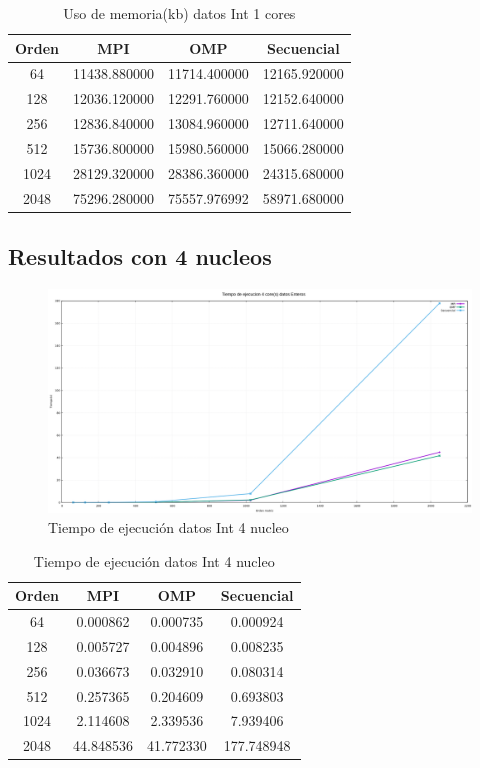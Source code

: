 \documentclass[10pt]{IEEEtran}
\begin{document}
\begin{table}[H]
  \caption{Uso de memoria(kb) datos Int 1 cores}
  \label{table_example}
  \centering
  \begin{tabular}{|c|c|c|c|}
    \hline
    \textbf{Orden} & \textbf{MPI} & \textbf{OMP} & \textbf{Secuencial} \\
    \hline
    64 & 11438.880000 & 11714.400000 & 12165.920000 \\
    128 & 12036.120000 & 12291.760000 & 12152.640000 \\
    256 & 12836.840000 & 13084.960000 & 12711.640000 \\
    512 & 15736.800000 & 15980.560000 & 15066.280000 \\
    1024 & 28129.320000 & 28386.360000 & 24315.680000 \\
    2048 & 75296.280000 & 75557.976992 & 58971.680000 \\
    \hline
  \end{tabular}
\end{table}

\subsection{Resultados con 4 nucleos}

\begin{figure}[H]
  \centering
  \includegraphics[width=0.95\linewidth]{figs/4nucleosEnterosTiempo.png}
  \caption{Tiempo de ejecución datos Int 4 nucleo}
  \label{fig:in}
\end{figure}

\begin{table}[H]
  \caption{Tiempo de ejecución datos Int 4 nucleo}
  \label{table_example}
  \centering
  \begin{tabular}{|c|c|c|c|}
    \hline
    \textbf{Orden} & \textbf{MPI} & \textbf{OMP} & \textbf{Secuencial} \\
    \hline
    64 & 0.000862 & 0.000735 & 0.000924 \\
    128 & 0.005727 & 0.004896 & 0.008235 \\
    256 & 0.036673 & 0.032910 & 0.080314 \\
    512 & 0.257365 & 0.204609 & 0.693803 \\
    1024 & 2.114608 & 2.339536 & 7.939406 \\
    2048 & 44.848536 & 41.772330 & 177.748948 \\
    \hline
  \end{tabular}
\end{table}
\end{document}
